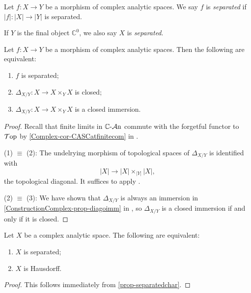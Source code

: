\begin{definition}
    Let $f:X\rightarrow Y$ be a morphism of complex analytic spaces. We say $f$ is \emph{separated} if $|f|:|X|\rightarrow |Y|$ is separated.

    If $Y$ is the final object $\mathbb{C}^0$, we also say $X$ is \emph{separated}.
\end{definition}
\begin{proposition}\label{prop-separatedchar}
    Let $f:X\rightarrow Y$ be a morphism of complex analytic spaces. Then the following are equivalent:
    \begin{enumerate}
        \item $f$ is separated;
        \item $\Delta_{X/Y}:X\rightarrow X\times_Y X$ is closed;
        \item $\Delta_{X/Y}:X\rightarrow X\times_Y X$ is a closed immersion.
    \end{enumerate}
\end{proposition}
\begin{proof}
    Recall that finite limits in $\mathbb{C}\text{-}\mathcal{A}\mathrm{n}$ commute with the forgetful functor to $\mathcal{T}\mathrm{op}$ by \cref{Complex-cor-CASCatfinitecom} in .

    (1) $\equiv$ (2): The undelrying morphism of topological spaces of $\Delta_{X/Y}$ is identified with
    \[
        |X|\rightarrow |X|\times_{|Y|} |X|,  
    \]
    the topological diagonal. It suffices to apply \cite[\href{https://stacks.math.columbia.edu/tag/0CY2}{Tag 0CY2}]{stacks-project}.

    (2) $\equiv$ (3): We have shown that $\Delta_{X/Y}$ is always an immersion in \cref{ConstructionComplex-prop-diagoimm} in , so $\Delta_{X/Y}$ is a closed immersion if and only if it is closed.
\end{proof}
\begin{corollary}
    Let $X$ be a complex analytic space.
    The following are equivalent:
    \begin{enumerate}
        \item $X$ is separated;
        \item $X$ is Hausdorff.
    \end{enumerate}
\end{corollary}
\begin{proof}
    This follows immediately from \cref{prop-separatedchar}.
\end{proof}

